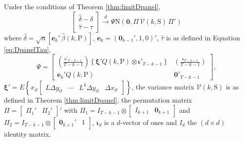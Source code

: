 \begin{thm}
  \label{thm:DpanelJoint}
  Under the conditions of Theorem \ref{thm:limitDpanel},
  \[
    \left[
      \begin{array}{c} 
        \widehat{\delta} - \delta \\ \widehat{\tau} - \tau 
      \end{array} 
    \right] \overset{d}{\rightarrow} \Psi \mbox{N}\left(\mathbf{0}, \Pi\,\mathcal{V}\left(k,\text{S}\right)\,\Pi'\right)
  \]
  where $\widehat{\delta} = \sqrt{n}[ \mathbf{e}_k' \,\widehat{\beta}(k,\text{P})]$, $\mathbf{e}_k = (\mathbf{0}_{k-1}', 1, 0)'$,  $\widehat{\tau}$ is as defined in Equation \ref{eq:DpanelTau}, 
\[
  \Psi = \left[
  \begin{array}{cc}
    \displaystyle\left( \frac{\boldsymbol{\iota}'_{T-k-1}}{T-k-1} \right)  \left\{ \boldsymbol{\xi}' Q(k,\text{P}) \otimes \boldsymbol{\iota}'_{T-k-1} \right\}& \displaystyle \left(\frac{\boldsymbol{\iota}_{T-k-1}}{T-k-1}\right) \\ 
    \mathbf{e}_k' Q(k,\text{P}) & \mathbf{0}'_{T-k-1}
  \end{array}
\right],
\]
  $\boldsymbol{\xi}' = E\left\{ x_{it} \left[
    \begin{array}{cccc}
      L \Delta y_{it} & \cdots & L^k \Delta y_{it} & \Delta x_{it}
  \end{array} \right]\right\}$,
  the variance matrix $\mathcal{V}(k,\text{S})$ is as defined in Theorem \ref{thm:limitDpanel}, the permutation matrix $\Pi = \left[
  \begin{array}{cc}
    \Pi_1' & \Pi_2'
  \end{array}
\right]'$ with $\Pi_1 = I_{T-k-1} \otimes \left[
\begin{array}{cc}
  I_{k+1} & \mathbf{0}_{k+1}
\end{array}
\right]$ and $\Pi_2 = I_{T-k-1}\otimes \left[
\begin{array}{cc}
  \mathbf{0}_{k+1}' & 1
\end{array}
\right]$,
  $\boldsymbol{\iota}_{d}$ is a $d$-vector of ones and $I_d$ the $(d\times d)$ identity matrix.
\end{thm}


